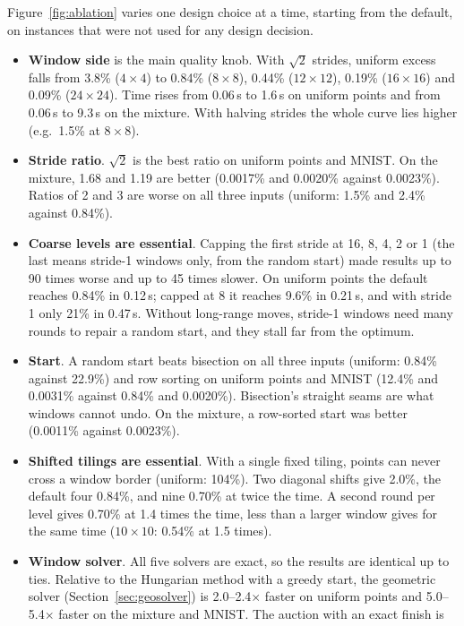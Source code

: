 Figure~\ref{fig:ablation} varies one design choice at a time, starting from the default,
on instances that were not used for any design decision.
\begin{itemize}
\item \textbf{Window side} is the main quality knob. With $\sqrt2$ strides, uniform excess
  falls from 3.8\% ($4\times4$) to 0.84\% ($8\times8$), 0.44\% ($12\times12$), 0.19\%
  ($16\times16$) and 0.09\% ($24\times24$). Time rises from 0.06\,s to 1.6\,s on uniform points
  and from 0.06\,s to 9.3\,s on the mixture. With halving strides the whole curve lies higher
  (e.g.\ 1.5\% at $8\times8$).
\item \textbf{Stride ratio}. $\sqrt2$ is the best ratio on uniform points and MNIST. On the
  mixture, 1.68 and 1.19 are better (0.0017\% and 0.0020\% against 0.0023\%). Ratios of 2 and 3
  are worse on all three inputs (uniform: 1.5\% and 2.4\% against 0.84\%).
\item \textbf{Coarse levels are essential}. Capping the first stride at 16, 8, 4, 2 or 1 (the
  last means stride-1 windows only, from the random start) made results up to 90 times
  worse and up to 45 times slower. On uniform points the default reaches 0.84\% in 0.12\,s;
  capped at 8 it reaches 9.6\% in 0.21\,s, and with stride 1 only 21\% in 0.47\,s. Without
  long-range moves, stride-1 windows need many rounds to repair a random start, and they
  stall far from the optimum.
\item \textbf{Start}. A random start beats bisection on all three inputs (uniform: 0.84\%
  against 22.9\%) and row sorting on uniform points and MNIST (12.4\% and 0.0031\% against
  0.84\% and 0.0020\%). Bisection's straight seams are what windows cannot undo. On the
  mixture, a row-sorted start was better (0.0011\% against 0.0023\%).
\item \textbf{Shifted tilings are essential}. With a single fixed tiling, points can never
  cross a window border (uniform: 104\%). Two diagonal shifts give 2.0\%, the default four
  0.84\%, and nine 0.70\% at twice the time. A second round per level gives 0.70\% at 1.4
  times the time, less than a larger window gives for the same time ($10\times10$: 0.54\% at
  1.5 times).
\item \textbf{Window solver}. All five solvers are exact, so the results are identical
  up to ties. Relative to the Hungarian method with a greedy start, the geometric solver
  (Section~\ref{sec:geosolver}) is 2.0--2.4$\times$ faster on uniform points and
  5.0--5.4$\times$ faster on the mixture and MNIST. The auction with an exact finish is

\end{itemize}
